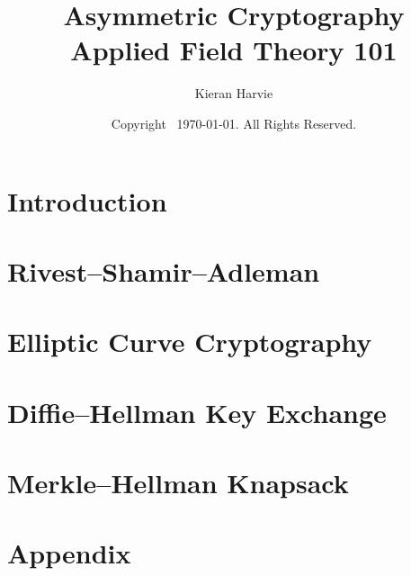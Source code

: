 \documentclass[12pt]{report}
\title{Asymmetric Cryptography \\ \large Applied Field Theory 101}
\date{Copyright \textcopyright \, \today. All Rights Reserved.}
\author{Kieran Harvie}
\begin{document}
\maketitle
\tableofcontents

\chapter{Introduction}




\chapter{Rivest–Shamir–Adleman}



\chapter{Elliptic Curve Cryptography}




\chapter{Diffie–Hellman Key Exchange}


\chapter{Merkle–Hellman Knapsack}




\renewcommand{\thechapter}{A}
\chapter{Appendix}



\end{document}
